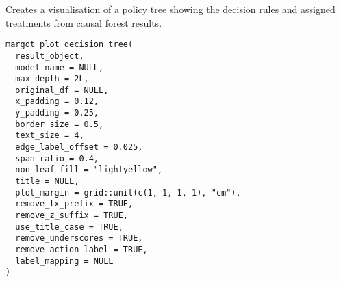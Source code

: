 \documentclass[a4paper]{book}
\begin{document}
%
\begin{Description}
Creates a visualisation of a policy tree showing the decision rules
and assigned treatments from causal forest results.
\end{Description}
%
\begin{Usage}
\begin{verbatim}
margot_plot_decision_tree(
  result_object,
  model_name = NULL,
  max_depth = 2L,
  original_df = NULL,
  x_padding = 0.12,
  y_padding = 0.25,
  border_size = 0.5,
  text_size = 4,
  edge_label_offset = 0.025,
  span_ratio = 0.4,
  non_leaf_fill = "lightyellow",
  title = NULL,
  plot_margin = grid::unit(c(1, 1, 1, 1), "cm"),
  remove_tx_prefix = TRUE,
  remove_z_suffix = TRUE,
  use_title_case = TRUE,
  remove_underscores = TRUE,
  remove_action_label = TRUE,
  label_mapping = NULL
)
\end{verbatim}
\end{Usage}
%
\end{document}
